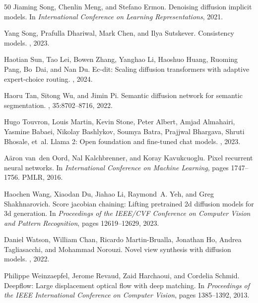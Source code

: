\documentclass[manuscript,screen,review]{acmart}
\begin{document}
\begin{thebibliography}{50}
Jiaming Song, Chenlin Meng, and Stefano Ermon.
\newblock Denoising diffusion implicit models.
\newblock In {\em International Conference on Learning Representations}, 2021.

Yang Song, Prafulla Dhariwal, Mark Chen, and Ilya Sutskever.
\newblock Consistency models.
, 2023.

Haotian Sun, Tao Lei, Bowen Zhang, Yanghao Li, Haoshuo Huang, Ruoming Pang, Bo~Dai, and Nan Du.
\newblock Ec-dit: Scaling diffusion transformers with adaptive expert-choice routing.
, 2024.

Haoru Tan, Sitong Wu, and Jimin Pi.
\newblock Semantic diffusion network for semantic segmentation.
, 35:8702--8716, 2022.

Hugo Touvron, Louis Martin, Kevin Stone, Peter Albert, Amjad Almahairi, Yasmine Babaei, Nikolay Bashlykov, Soumya Batra, Prajjwal Bhargava, Shruti Bhosale, et~al.
\newblock Llama 2: Open foundation and fine-tuned chat models.
, 2023.

A{\"a}ron van~den Oord, Nal Kalchbrenner, and Koray Kavukcuoglu.
\newblock Pixel recurrent neural networks.
\newblock In {\em International Conference on Machine Learning}, pages 1747--1756. PMLR, 2016.

Haochen Wang, Xiaodan Du, Jiahao Li, Raymond~A. Yeh, and Greg Shakhnarovich.
\newblock Score jacobian chaining: Lifting pretrained 2d diffusion models for 3d generation.
\newblock In {\em Proceedings of the IEEE/CVF Conference on Computer Vision and Pattern Recognition}, pages 12619--12629, 2023.

Daniel Watson, William Chan, Ricardo Martin-Brualla, Jonathan Ho, Andrea Tagliasacchi, and Mohammad Norouzi.
\newblock Novel view synthesis with diffusion models.
, 2022.

Philippe Weinzaepfel, Jerome Revaud, Zaid Harchaoui, and Cordelia Schmid.
\newblock Deepflow: Large displacement optical flow with deep matching.
\newblock In {\em Proceedings of the IEEE International Conference on Computer Vision}, pages 1385--1392, 2013.


\end{thebibliography}
\end{document}
